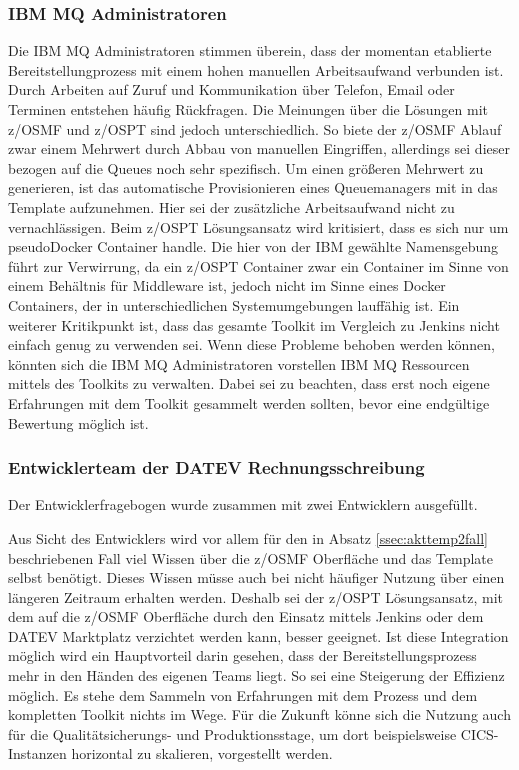 \subsubsection{IBM MQ Administratoren}
Die IBM MQ Administratoren stimmen überein, dass der momentan etablierte Bereitstellungprozess mit einem hohen manuellen Arbeitsaufwand verbunden ist.
Durch Arbeiten auf Zuruf und Kommunikation über Telefon, Email oder Terminen entstehen häufig Rückfragen.
Die Meinungen über die Lösungen mit z/OSMF und z/OSPT sind jedoch unterschiedlich.
So biete der z/OSMF Ablauf zwar einem Mehrwert durch Abbau von manuellen Eingriffen, allerdings sei dieser bezogen auf die Queues noch sehr spezifisch.
Um einen größeren Mehrwert zu generieren, ist das automatische Provisionieren eines Queuemanagers mit in das Template aufzunehmen.
Hier sei der zusätzliche Arbeitsaufwand nicht zu vernachlässigen.
Beim z/OSPT Lösungsansatz wird kritisiert, dass es sich nur um \glqq pseudo\grqq Docker Container handle.
Die hier von der IBM gewählte Namensgebung führt zur Verwirrung, da ein z/OSPT Container zwar ein Container im Sinne von einem Behältnis für Middleware ist, jedoch nicht im Sinne eines Docker Containers, der in unterschiedlichen Systemumgebungen lauffähig ist.
Ein weiterer Kritikpunkt ist, dass das gesamte Toolkit im Vergleich zu Jenkins nicht einfach genug zu verwenden sei.
Wenn diese Probleme behoben werden können, könnten sich die IBM MQ Administratoren vorstellen IBM MQ Ressourcen mittels des Toolkits zu verwalten.
Dabei sei zu beachten, dass erst noch eigene Erfahrungen mit dem Toolkit gesammelt werden sollten, bevor eine endgültige Bewertung möglich ist.

\subsubsection{Entwicklerteam der DATEV Rechnungsschreibung}
Der Entwicklerfragebogen wurde zusammen mit zwei Entwicklern ausgefüllt.

Aus Sicht des Entwicklers wird vor allem für den in Absatz \ref{ssec:akttemp2fall} beschriebenen Fall viel Wissen über die z/OSMF Oberfläche und das Template selbst benötigt.
Dieses Wissen müsse auch bei nicht häufiger Nutzung über einen längeren Zeitraum erhalten werden.
Deshalb sei der z/OSPT Lösungsansatz, mit dem auf die z/OSMF Oberfläche durch den Einsatz mittels Jenkins oder dem DATEV \glqq Marktplatz\grqq{} verzichtet werden kann, besser geeignet.
Ist diese Integration möglich wird ein Hauptvorteil darin gesehen, dass der Bereitstellungsprozess mehr in den Händen des eigenen Teams liegt.
So sei eine Steigerung der Effizienz möglich.
Es stehe dem Sammeln von Erfahrungen mit dem Prozess und dem kompletten Toolkit nichts im Wege.
Für die Zukunft könne sich die Nutzung auch für die Qualitätsicherungs- und Produktionsstage, um dort beispielsweise CICS-Instanzen horizontal zu skalieren, vorgestellt werden.

